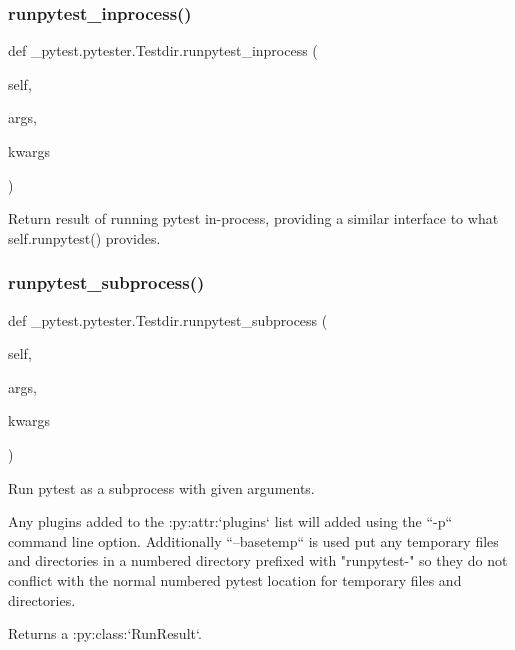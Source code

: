 \subsubsection{\texorpdfstring{runpytest\+\_\+inprocess()}{runpytest\_inprocess()}}
{\footnotesize\ttfamily def \+\_\+pytest.\+pytester.\+Testdir.\+runpytest\+\_\+inprocess (\begin{DoxyParamCaption}\item[{}]{self,  }\item[{}]{args,  }\item[{}]{kwargs }\end{DoxyParamCaption})}

\begin{DoxyVerb}Return result of running pytest in-process, providing a similar
interface to what self.runpytest() provides.\end{DoxyVerb}
 \mbox{\label{class__pytest_1_1pytester_1_1_testdir_ac919df5fd43e3a87ef9ddc9ec6ef94c1}} 
\subsubsection{\texorpdfstring{runpytest\+\_\+subprocess()}{runpytest\_subprocess()}}
{\footnotesize\ttfamily def \+\_\+pytest.\+pytester.\+Testdir.\+runpytest\+\_\+subprocess (\begin{DoxyParamCaption}\item[{}]{self,  }\item[{}]{args,  }\item[{}]{kwargs }\end{DoxyParamCaption})}

\begin{DoxyVerb}Run pytest as a subprocess with given arguments.

Any plugins added to the :py:attr:`plugins` list will added using the
``-p`` command line option.  Additionally ``--basetemp`` is used put
any temporary files and directories in a numbered directory prefixed
with "runpytest-" so they do not conflict with the normal numbered
pytest location for temporary files and directories.

Returns a :py:class:`RunResult`.\end{DoxyVerb}
 \mbox{\label{class__pytest_1_1pytester_1_1_testdir_a2dff2082ac09b7a20411dd8e7e3422b6}} 
